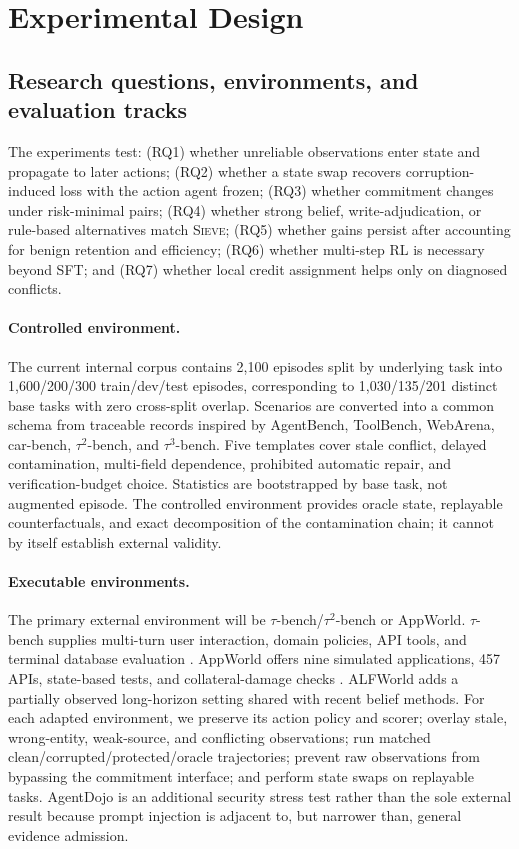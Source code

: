 \documentclass{article}
\newcommand{\method}{\textsc{Sieve}}
\begin{document}
\section{Experimental Design}
\label{sec:experiments}

\subsection{Research questions, environments, and evaluation tracks}

The experiments test: (RQ1) whether unreliable observations enter state and propagate to later actions; (RQ2) whether a state swap recovers corruption-induced loss with the action agent frozen; (RQ3) whether commitment changes under risk-minimal pairs; (RQ4) whether strong belief, write-adjudication, or rule-based alternatives match \method; (RQ5) whether gains persist after accounting for benign retention and efficiency; (RQ6) whether multi-step RL is necessary beyond SFT; and (RQ7) whether local credit assignment helps only on diagnosed conflicts.

\paragraph{Controlled environment.}
The current internal corpus contains 2,100 episodes split by underlying task into 1,600/200/300 train/dev/test episodes, corresponding to 1,030/135/201 distinct base tasks with zero cross-split overlap. Scenarios are converted into a common schema from traceable records inspired by AgentBench, ToolBench, WebArena, car-bench, $\tau^2$-bench, and $\tau^3$-bench. Five templates cover stale conflict, delayed contamination, multi-field dependence, prohibited automatic repair, and verification-budget choice. Statistics are bootstrapped by base task, not augmented episode. The controlled environment provides oracle state, replayable counterfactuals, and exact decomposition of the contamination chain; it cannot by itself establish external validity.

\paragraph{Executable environments.}
The primary external environment will be $\tau$-bench/$\tau^2$-bench or AppWorld. $\tau$-bench supplies multi-turn user interaction, domain policies, API tools, and terminal database evaluation \citep{yao2025taubench}. AppWorld offers nine simulated applications, 457 APIs, state-based tests, and collateral-damage checks \citep{trivedi2024appworld}. ALFWorld adds a partially observed long-horizon setting shared with recent belief methods. For each adapted environment, we preserve its action policy and scorer; overlay stale, wrong-entity, weak-source, and conflicting observations; run matched clean/corrupted/protected/oracle trajectories; prevent raw observations from bypassing the commitment interface; and perform state swaps on replayable tasks. AgentDojo is an additional security stress test rather than the sole external result because prompt injection is adjacent to, but narrower than, general evidence admission.
\end{document}
